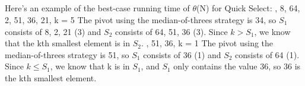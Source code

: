 \documentclass{article}
\begin{document}
\subsection{}
Here's an example of the best-case running time of $\theta$(N) for Quick Select:
, 8, 64, 2, 51, 36, 21, k = 5
\newline
The pivot using the median-of-threes strategy is 34, so $S_1$ consists of 8, 2, 21 (3) and $S_2$ consists of 64, 51, 36 (3). Since $k > S_1$, we know that the kth smallest element is in $S_2$.
, 51, 36, k = 1
\newline
The pivot using the median-of-threes strategy is 51, so $S_1$ consists of 36 (1) and $S_2$ consists of 64 (1). Since $k \leq S_1$, we know that k is in $S_1$, and $S_1$ only contains the value 36, so 36 is the kth smallest element.
\end{document}
